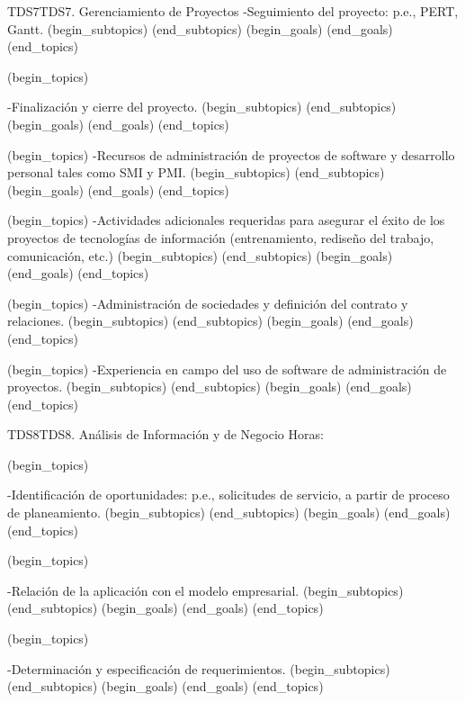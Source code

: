 \begin{BKL2}{TDS7}{TDS7. Gerenciamiento de Proyectos}
-Seguimiento del proyecto: p.e., PERT, Gantt.
(begin_subtopics)
(end_subtopics)
(begin_goals)
(end_goals)
(end_topics)

 

(begin_topics)

-Finalización y cierre del proyecto.
(begin_subtopics)
(end_subtopics)
(begin_goals)
(end_goals)
(end_topics)

(begin_topics)
-Recursos de administración de proyectos de software y desarrollo personal tales como SMI y PMI.
(begin_subtopics)
(end_subtopics)
(begin_goals)
(end_goals)
(end_topics)

(begin_topics)
-Actividades adicionales requeridas para asegurar el éxito de los proyectos de tecnologías de información (entrenamiento, rediseño del trabajo, comunicación, etc.)
(begin_subtopics)
(end_subtopics)
(begin_goals)
(end_goals)
(end_topics)

(begin_topics)
-Administración de sociedades y definición del contrato y relaciones.
(begin_subtopics)
(end_subtopics)
(begin_goals)
(end_goals)
(end_topics)

(begin_topics)
-Experiencia en campo del uso de software de administración de proyectos.
(begin_subtopics)
(end_subtopics)
(begin_goals)
(end_goals)
(end_topics)



\end{BKL2}



\begin{BKL2}{TDS8}{TDS8. Análisis de Información y de Negocio}
Horas:
 
(begin_topics)

-Identificación de oportunidades: p.e., solicitudes de servicio, a partir de proceso de planeamiento.
(begin_subtopics)
(end_subtopics)
(begin_goals)
(end_goals)
(end_topics)

 

(begin_topics)

-Relación de la aplicación con el modelo empresarial.
(begin_subtopics)
(end_subtopics)
(begin_goals)
(end_goals)
(end_topics)

 

(begin_topics)

-Determinación y especificación de requerimientos.
(begin_subtopics)
(end_subtopics)
(begin_goals)
(end_goals)
(end_topics)

\end{BKL2}



